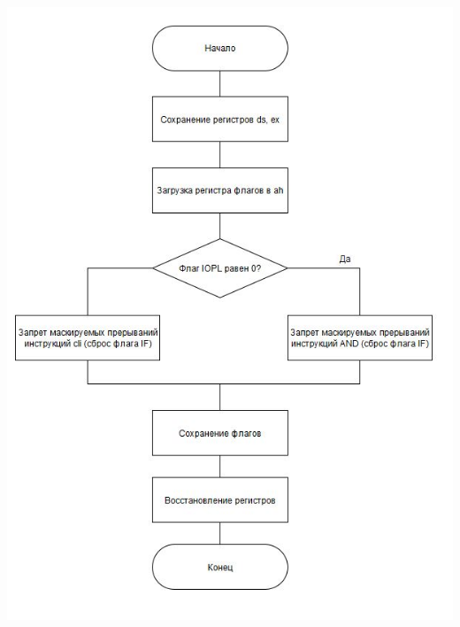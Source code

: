 \documentclass[a4paper,12pt]{article}
\begin{document}
\begin{center}
	\includegraphics[scale=1]{scheme3.JPG}
\end{center}
\end{document}
